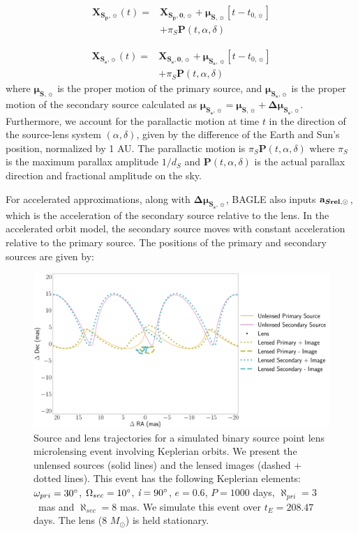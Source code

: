 \documentclass[twocolumn]{aastex701}
\newcommand{\vect}[1]{\boldsymbol{#1}}
\newcommand{\accSsec}{\bold{a}_{\boldsymbol{S\mathrm{rel}},\sun}}
\newcommand{\tnot}{t_{0,\sun}}
\newcommand{\musvec}{\vect{\mu}_{\boldsymbol{S},\sun}}
\newcommand{\mussvec}{\vect{\mu}_{\boldsymbol{S_s},\sun}}
\newcommand{\deltamussvec}{\vect{\Delta\mu}_{\boldsymbol{S_s},\sun}}
\newcommand{\Xspovec}{\vect{X}_{\boldsymbol{S_p,0},\sun}}
\newcommand{\Xssovec}{\vect{X}_{\boldsymbol{S_s,0},\sun}}
\newcommand{\Xspvec}{\vect{X}_{\boldsymbol{S_p},\sun}}
\newcommand{\Xssvec}{\vect{X}_{\boldsymbol{S_s},\sun}}
\newcommand{\w}{\omega_{pri}}
\newcommand{\bigomega}{\Omega_{sec}}
\newcommand{\inclination}{\textit{i}}
\newcommand{\period}{\textit{P}}
\newcommand{\al}{\aleph_{pri}}
\newcommand{\ala}{\aleph_{sec}}
\begin{document}
\begin{align}
    \Xspvec (t) = & \Xspovec + \musvec [t - \tnot] \nonumber \\
    &+\pi_S \vect{P}(t, \alpha, \delta)  
    \label{linear_motion}    
\end{align}


\begin{align}
    \Xssvec (t) = & \Xssovec + \mussvec [t - \tnot ]\nonumber \\
    &+\pi_S \vect{P}(t, \alpha, \delta)  
    \label{linear_motion2}    
\end{align}
%
where $\musvec$ is the proper motion of the primary source, and $\mussvec$ is the proper motion of the secondary source calculated as $\mussvec = \musvec + \deltamussvec$. Furthermore, we account for the parallactic motion at time $t$ in the direction of the source-lens system $(\alpha, \delta)$, given by the difference of the Earth and Sun's position, normalized by 1 AU.  The parallactic motion is $\pi_S
\vect{P}(t, \alpha, \delta)$ where $\pi_S$ is the
maximum parallax amplitude $1/d_S$ and $\vect{P}(t, \alpha, \delta)$ is the actual parallax direction and fractional amplitude on the sky.

For accelerated approximations, along with $\deltamussvec$, BAGLE also inputs $\accSsec$, which is the acceleration of the secondary source relative to the lens. In the accelerated orbit model, the secondary source moves with constant acceleration relative to the primary source. The positions of the primary and secondary sources are given by: 

\begin{figure}
    \centering
    \includegraphics[width=  \textwidth] {figures/bspl_keplerian.png}
    \caption{Source and lens trajectories for a simulated binary source point lens microlensing event involving Keplerian orbits. We present the unlensed sources (solid lines) and the lensed images (dashed + dotted lines). This event has the following Keplerian elements: $\w = 30 \degree$, $\bigomega = 10 \degree$, $\inclination = 90 \degree$, $e=0.6$, $\period = 1000$ days, $\al = 3  $~mas and $\ala = 8 $ mas. We simulate this event over $t_E=208.47$ days. The lens (8 $M_\odot$) is held stationary.}
    \label{fig:bspl_keplerian}
\end{figure}
\end{document}
